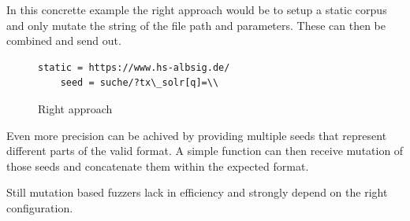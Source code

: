 \documentclass[journal=tosc,final]{iacrtrans}
\begin{document}
In this concrette example the right approach would be to setup a  static corpus and only mutate the string of the file path and parameters. 
These can then be combined and send out.


\begin{figure}[h]
 \caption{Right approach}
 \begin{lstlisting}[style=code]
	static = https://www.hs-albsig.de/  
	seed = suche/?tx\_solr[q]=\\
 \end{lstlisting}
\end{figure}


Even more precision can be achived by providing multiple seeds that represent different parts of the valid format. A simple function can then receive mutation of those seeds and concatenate them within the expected format.

Still mutation based fuzzers lack in efficiency and strongly depend on the right configuration. 
\newpage
\end{document}
